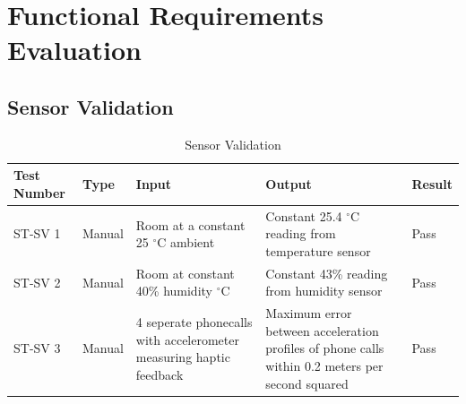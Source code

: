 \documentclass[12pt, titlepage]{article}
\begin{document}

\newpage

\tableofcontents

\listoftables %

\listoffigures %

\newpage




\section{Functional Requirements Evaluation}
\subsection{Sensor Validation}
\begin{table}[H]
  \begin{tabular}{| p{} | p{}| p{}| p{}| p{}|}
    \hline
    \rowcolor[gray]{0.9}
    Test Number & Type & Input & Output & Result\\
    \hline
    ST-SV 1 & Manual & Room at a constant 25 $^{\circ}$C ambient & Constant 25.4 $^{\circ}$C reading from temperature sensor & Pass \\
    \hline
    ST-SV 2 & Manual & Room at constant 40\% humidity $^{\circ}$C & Constant 43\% reading from humidity sensor & Pass \\
    \hline
    ST-SV 3 & Manual & 4 seperate phonecalls with accelerometer measuring haptic feedback & Maximum error between acceleration profiles of phone calls within 0.2 meters per second squared & Pass  \\
    \hline
  \end{tabular}
  \caption{Sensor Validation}
  \end{table}

\end{document}
